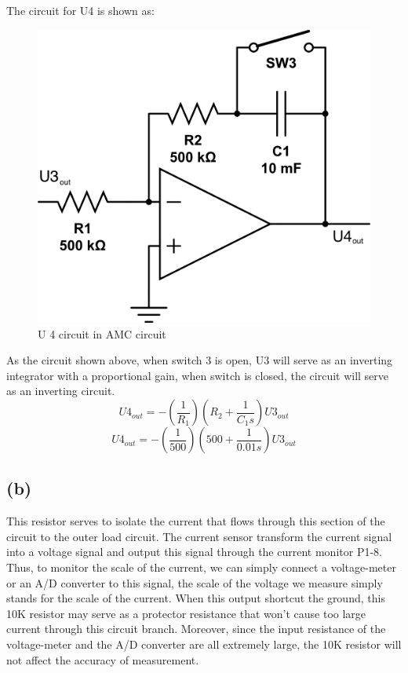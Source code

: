 \documentclass[letterpaper]{article}
\begin{document}
The circuit for U4 is shown as:
\begin{figure}[H]
	\centering
	\includegraphics[scale=0.15]{q1a_u4.png}
	\caption{U 4 circuit in AMC circuit}
\end{figure}
As the circuit shown above, when switch 3 is open, U3 will serve as an inverting integrator with a proportional gain, when switch is closed, the circuit will serve as an inverting circuit.
$$U4_{out} = - \left( \frac{1}{R_1} \right) \left( R_2 + \frac{1}{C_1s} \right) U3_{out} $$
$$U4_{out} = - \left( \frac{1}{500} \right) \left( 500 + \frac{1}{0.01s} \right) U3_{out} $$

\subsection*{(b)}
This resistor serves to isolate the current that flows through this section of the circuit to the outer load circuit. The current sensor transform the current signal into a voltage signal and output this signal through the current monitor P1-8. Thus, to monitor the scale of the current, we can simply connect a voltage-meter or an A/D converter to this signal, the scale of the voltage we measure simply stands for the scale of the current. When this output shortcut the ground, this 10K resistor may serve as a protector resistance that won't cause too large current through this circuit branch. Moreover, since the input resistance of the voltage-meter and the A/D converter are all extremely large, the 10K resistor will not affect the accuracy of measurement.
\end{document}
